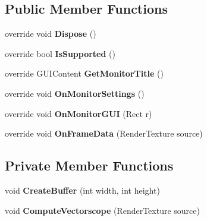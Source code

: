 \subsection*{Public Member Functions}
\begin{DoxyCompactItemize}
\item 
\mbox{\label{class_unity_editor_1_1_post_processing_1_1_vectorscope_monitor_a005eed06f524b178cf20c653a065e4b8}} 
override void {\bfseries Dispose} ()
\item 
\mbox{\label{class_unity_editor_1_1_post_processing_1_1_vectorscope_monitor_a463538bb61faf99a1507ac9501eb7de1}} 
override bool {\bfseries Is\+Supported} ()
\item 
\mbox{\label{class_unity_editor_1_1_post_processing_1_1_vectorscope_monitor_aaab4f236c863002855bf65f364e981ea}} 
override G\+U\+I\+Content {\bfseries Get\+Monitor\+Title} ()
\item 
\mbox{\label{class_unity_editor_1_1_post_processing_1_1_vectorscope_monitor_af640d93cb043401ba229796ac3803c1e}} 
override void {\bfseries On\+Monitor\+Settings} ()
\item 
\mbox{\label{class_unity_editor_1_1_post_processing_1_1_vectorscope_monitor_acb7862e8e86f2eb6cd33d8b2c89be22e}} 
override void {\bfseries On\+Monitor\+G\+UI} (Rect r)
\item 
\mbox{\label{class_unity_editor_1_1_post_processing_1_1_vectorscope_monitor_aad2a91361031b9b19ad81a7b72f9b695}} 
override void {\bfseries On\+Frame\+Data} (Render\+Texture source)
\end{DoxyCompactItemize}
\subsection*{Private Member Functions}
\begin{DoxyCompactItemize}
\item 
\mbox{\label{class_unity_editor_1_1_post_processing_1_1_vectorscope_monitor_ad6ac12eb124b8aba8377a0e6dfd2331d}} 
void {\bfseries Create\+Buffer} (int width, int height)
\item 
\mbox{\label{class_unity_editor_1_1_post_processing_1_1_vectorscope_monitor_a8ed2b20a182be70ba996d658ae6934ce}} 
void {\bfseries Compute\+Vectorscope} (Render\+Texture source)
\end{DoxyCompactItemize}
